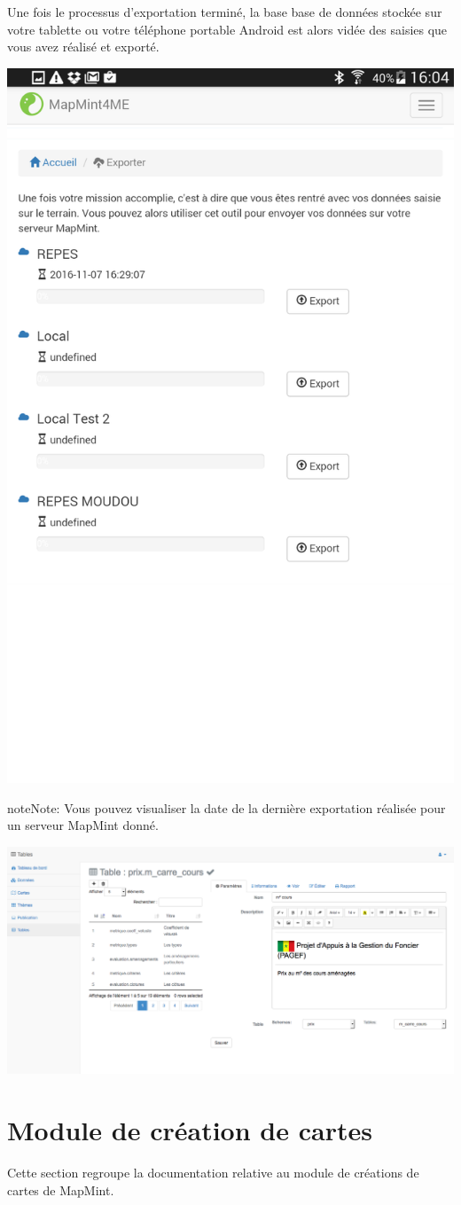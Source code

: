 \documentclass[letterpaper,10pt,french]{sphinxmanual}
\begin{document}
Une fois le processus d'exportation terminé, la base base de données stockée sur votre tablette ou votre téléphone portable Android est alors vidée des saisies que vous avez réalisé et exporté.

{\hfill\includegraphics[width=0.450\linewidth]{mm4me-export.png}\hfill}

\begin{notice}{note}{Note:}
Vous pouvez visualiser la date de la dernière exportation réalisée pour un serveur MapMint donné.
\end{notice}

\includegraphics[width=1.000\linewidth]{table-module-preview.png}


\chapter{Module de création de cartes}
\label{maps/index:maps}\label{maps/index::doc}\label{maps/index:module-de-creation-de-cartes}
Cette section regroupe la documentation relative au module de créations de cartes de MapMint.
\end{document}
